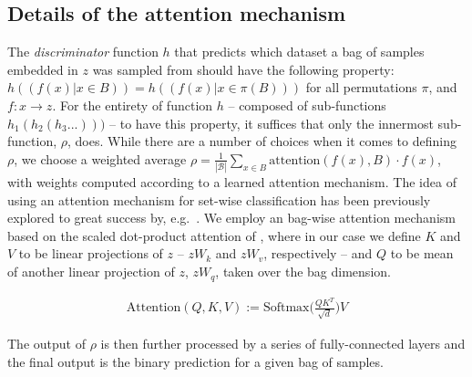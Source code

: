 \subsection{Details of the attention mechanism}\label{ssec:attention-mechanism}
%
The \emph{discriminator} function $h$ that predicts which dataset a bag of samples embedded in $z$
was sampled from should have the following property: \( h((f(x) | x \in B)) = h((f(x) | x \in \pi
(B))) \) for all permutations $\pi$, and $f: x \to z$. 
%
For the entirety of function $h$ -- composed of sub-functions \( h_1(h_2(h_3...))) \) -- to have this
property, it suffices that only the innermost sub-function, $\rho$, does. 
%
While there are a number of choices when it comes to defining $\rho$, we choose a weighted average
$\rho = \frac{1}{|\mathcal{B}|} \sum_{x \in B}\mathrm{attention}(f(x), B) \cdot f(x)$, with weights
computed according to a learned attention mechanism. 
%
The idea of using an attention mechanism for set-wise classification has been previously explored
to great success by, e.g.\ \citet{lee2019set}. %
%
We employ an bag-wise attention mechanism based on the scaled dot-product attention of
\citet{vaswani2017attention}, where in our case we define $K$ and $V$ to be linear projections of
$z$ -- $zW_k$ and $zW_v$, respectively -- and $Q$ to be mean of another linear projection of $z$,
$zW_q$, taken over the bag dimension.

\begin{align*}
  \text{Attention}(\mathit{Q}, \mathit{K}, \mathit{V}) := \text{Softmax} \biggl( \frac{ \mathit{Q}
  \mathit{K}^T  } { \sqrt{d} } \biggr) V
\end{align*}

The output of $\rho$ is then further processed by a series of fully-connected layers and the final
output is the binary prediction for a given bag of samples.

